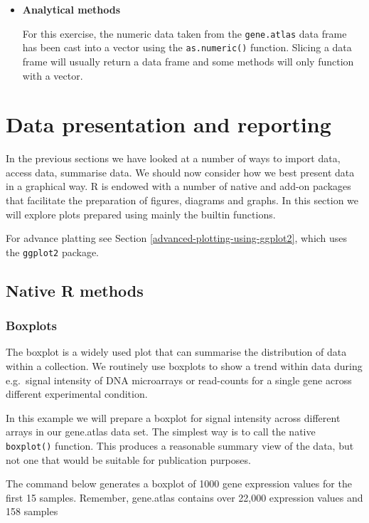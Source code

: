 \documentclass[a4paper]{book}
\newenvironment{rmdblock}[1]
  {\vspace{1.5em}\begin{shaded*}
  \begin{itemize}
  \renewcommand{\labelitemi}{
    \raisebox{-.7\height}[0pt][0pt]{
      {\setkeys{Gin}{width=3em,keepaspectratio}\texttt{[image: images/\#1]}}
    }
  }
  \item
  }
  {
  \end{itemize}
  \end{shaded*}
  }
\newenvironment{rmdtip}
  {\begin{rmdblock}{tip}}
  {\end{rmdblock}}
\begin{document}
\begin{rmdtip}
\textbf{Analytical methods}

For this exercise, the numeric data taken from the \texttt{gene.atlas}
data frame has been cast into a vector using the \texttt{as.numeric()}
function. Slicing a data frame will usually return a data frame and some
methods will only function with a vector.
\end{rmdtip}

\chapter{Data presentation and
reporting}\label{data-presentation-and-reporting}

In the previous sections we have looked at a number of ways to import
data, access data, summarise data. We should now consider how we best
present data in a graphical way. R is endowed with a number of native
and add-on packages that facilitate the preparation of figures, diagrams
and graphs. In this section we will explore plots prepared using mainly
the builtin functions.

For advance platting see Section \ref{advanced-plotting-using-ggplot2},
which uses the \texttt{ggplot2} package.

\section{Native R methods}\label{native-r-methods}

\subsection{Boxplots}\label{boxplots}

The boxplot is a widely used plot that can summarise the distribution of
data within a collection. We routinely use boxplots to show a trend
within data during e.g.~signal intensity of DNA microarrays or
read-counts for a single gene across different experimental condition.

In this example we will prepare a boxplot for signal intensity across
different arrays in our gene.atlas data set. The simplest way is to call
the native \texttt{boxplot()} function. This produces a reasonable
summary view of the data, but not one that would be suitable for
publication purposes.

The command below generates a boxplot of 1000 gene expression values for
the first 15 samples. Remember, gene.atlas contains over 22,000
expression values and 158 samples
\end{document}
